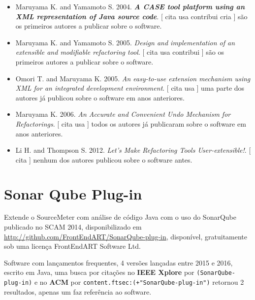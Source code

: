 \begin{itemize}
\item Maruyama K. and Yamamoto S.
      2004.
        \textbf{\textit{ A CASE tool platform using an XML representation of Java source code}}.
      [
          cita
          usa
          contribui
          cria
      ]
são os primeiros autores a publicar sobre o software.
\item Maruyama K. and Yamamoto S.
      2005.
        \textit{ Design and implementation of an extensible and modifiable refactoring tool}.
      [
          cita
          usa
          contribui
      ]
são os primeiros autores a publicar sobre o software.
\item Omori T. and Maruyama K.
      2005.
        \textit{ An easy-to-use extension mechanism using XML for an integrated development environment}.
      [
          cita
          usa
      ]
uma parte dos autores já publicou sobre o software em anos anteriores.
\item Maruyama K.
      2006.
        \textit{ An Accurate and Convenient Undo Mechanism for Refactorings}.
      [
          cita
          usa
      ]
todos os autores já publicaram sobre o software em anos anteriores.
\item Li H. and Thompson S.
      2012.
        \textit{ Let's Make Refactoring Tools User-extensible!}.
      [
          cita
      ]
nenhum dos autores publicou sobre o software antes.
\end{itemize}
\section{Sonar Qube Plug-in}

Extende o SourceMeter com análise de código Java com o uso do SonarQube
publicado no SCAM 2014,
disponibilizado em \url{http://github.com/FrontEndART/SonarQube-plug-in},
disponível,
gratuitamente
sob uma licença FrontEndART Software Ltd.

Software com lançamentos frequentes,
4 versões lançadas
entre 2015 e 2016,
escrito em Java,
uma busca por citações no {\bf IEEE Xplore} por
\texttt{(SonarQube-plug-in)}
e no {\bf ACM} por
\texttt{content.ftsec:(+"SonarQube-plug-in")}
retornou
2 resultados,
apenas um faz referência ao software.


